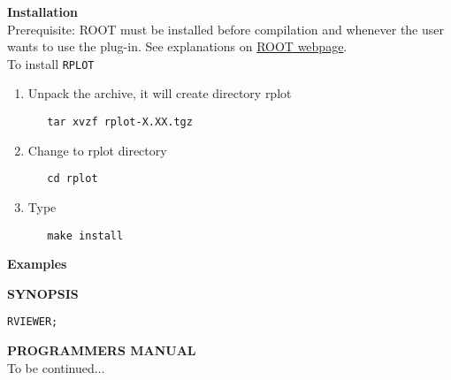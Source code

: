 
\textbf{Installation}\\
Prerequisite: ROOT must be installed before compilation and whenever
the user wants to use the plug-in. See explanations on
\href{http://root.cern.ch}{ROOT webpage}.  \\ 

To install \texttt{RPLOT} 
\begin{enumerate}
   \item  Unpack the archive, it will create directory rplot    
\begin{verbatim}
   tar xvzf rplot-X.XX.tgz
\end{verbatim}

   \item Change to rplot directory    
\begin{verbatim}
   cd rplot
\end{verbatim}

   \item Type     
\begin{verbatim}
   make install
\end{verbatim}
\end{enumerate}

\textbf{Examples}


\textbf{SYNOPSIS}
\begin{verbatim}
RVIEWER; 
\end{verbatim}


\textbf{PROGRAMMERS MANUAL  } \\

 To be continued... 

